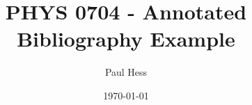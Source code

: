\documentclass{article}
\title{PHYS 0704 - Annotated Bibliography Example}
\author{Paul Hess}
\date{\today}
\begin{document}
\maketitle

\nocite{*} %


\end{document}
